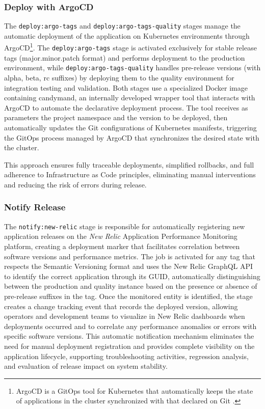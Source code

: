 \subsubsection{Deploy with ArgoCD}
The \texttt{deploy:argo-tags} and \texttt{deploy:argo-tags-quality} stages manage the automatic deployment of the application on Kubernetes environments through ArgoCD\footnote{ArgoCD is a GitOps tool for Kubernetes that automatically keeps the state of applications in the cluster synchronized with that declared on Git \cite{argocd}.}. The \texttt{deploy:argo-tags} stage is activated exclusively for stable release tags (major.minor.patch format) and performs deployment to the production environment, while \texttt{deploy:argo-tags-quality} handles pre-release versions (with alpha, beta, rc suffixes) by deploying them to the quality environment for integration testing and validation. Both stages use a specialized Docker image containing candymand, an internally developed wrapper tool that interacts with ArgoCD to automate the declarative deployment process. The tool receives as parameters the project namespace and the version to be deployed, then automatically updates the Git configurations of Kubernetes manifests, triggering the GitOps process managed by ArgoCD that synchronizes the desired state with the cluster. 

This approach ensures fully traceable deployments, simplified rollbacks, and full adherence to Infrastructure as Code principles, eliminating manual interventions and reducing the risk of errors during release.

\subsubsection{Notify Release}
The \texttt{notify:new-relic} stage is responsible for automatically registering new application releases on the \textit{New Relic} Application Performance Monitoring platform, creating a deployment marker that facilitates correlation between software versions and performance metrics. The job is activated for any tag that respects the Semantic Versioning format and uses the New Relic GraphQL API to identify the correct application through its GUID, automatically distinguishing between the production and quality instance based on the presence or absence of pre-release suffixes in the tag. Once the monitored entity is identified, the stage creates a change tracking event that records the deployed version, allowing operators and development teams to visualize in New Relic dashboards when deployments occurred and to correlate any performance anomalies or errors with specific software versions. This automatic notification mechanism eliminates the need for manual deployment registration and provides complete visibility on the application lifecycle, supporting troubleshooting activities, regression analysis, and evaluation of release impact on system stability.

